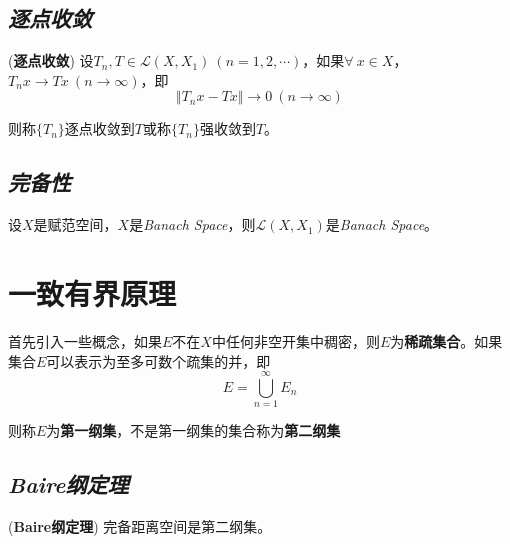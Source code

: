\subsection*{\textsl{逐点收敛}}

\begin{mdframed}
    \begin{define}(\textbf{逐点收敛})
        设$T_n,T\in \mathcal{L}(X,X_1)\ (n=1,2,\cdots)$，如果$\forall\ x\in X$，$T_nx\rightarrow Tx\ (n\rightarrow \infty)$，即
        \begin{equation}
            \Vert T_nx-Tx\Vert \rightarrow 0\ (n\rightarrow \infty)
        \end{equation}

        则称$\{T_n\}$逐点收敛到$T$或称$\{T_n\}$强收敛到$T$。
    \end{define}
\end{mdframed}

\subsection*{\textsl{完备性}}

\begin{mdframed}
    \begin{theorem}
        设$X$是赋范空间，$X$是\textsl{Banach Space}，则$\mathcal{L}(X,X_1)$是\textsl{Banach Space}。
    \end{theorem}
\end{mdframed}

\section{一致有界原理}

首先引入一些概念，如果$E$不在$X$中任何非空开集中稠密，则$E$为\textbf{稀疏集合}。如果集合$E$可以表示为至多可数个疏集的并，即
\begin{equation}
    E=\bigcup_{n=1}^{\infty} E_n
\end{equation}

则称$E$为\textbf{第一纲集}，不是第一纲集的集合称为\textbf{第二纲集}

\subsection*{\textsl{Baire纲定理}}

\begin{mdframed}
    \begin{theorem}
        (\textbf{Baire纲定理}) 完备距离空间是第二纲集。
    \end{theorem}
\end{mdframed}

